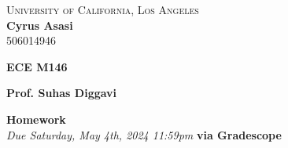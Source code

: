 \documentclass[letterpaper]{article}
\author{Hecate}
\date{\today}
\title{}
\theoremstyle{definition}
\begin{document}
\begin{center}
    \large\textsc{University of California, Los Angeles} \\
    \large\textbf{Cyrus Asasi} \\
    \large\textsc{506014946}
        
    \begin{minipage}[t]{0.5\textwidth}
        \raggedright
        \textbf{ECE M146}
    \end{minipage}%
    \begin{minipage}[t]{0.5\textwidth}
        \raggedleft
        \textbf{Prof. Suhas Diggavi}
    \end{minipage}
    \centering
    \large\textbf{Homework } \\
    \large\textit{Due Saturday, May 4th, 2024 11:59pm} \textbf{via Gradescope}
\end{center}
\vspace{0.5cm}
\end{document}
